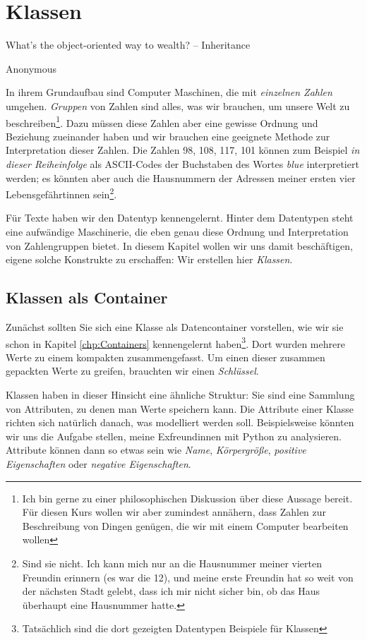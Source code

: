 \chapter{Klassen}
\label{chp:Classes}
\epigraph{
	What's the object-oriented way to wealth? -- Inheritance
}{Anonymous}

In ihrem Grundaufbau sind Computer Maschinen, die mit \emph{einzelnen Zahlen} umgehen. \emph{Gruppen} von Zahlen sind alles, was wir brauchen, um unsere Welt zu beschreiben\footnote{Ich bin gerne zu einer philosophischen Diskussion über diese Aussage bereit. Für diesen Kurs wollen wir aber zumindest annähern, dass Zahlen zur Beschreibung von Dingen genügen, die wir mit einem Computer bearbeiten wollen}. Dazu müssen diese Zahlen aber eine gewisse Ordnung und Beziehung zueinander haben und wir brauchen eine geeignete Methode zur Interpretation dieser Zahlen. Die Zahlen 98, 108, 117, 101 können zum Beispiel \emph{in dieser Reiheinfolge} als ASCII-Codes der Buchstaben des Wortes \emph{blue} interpretiert werden; es könnten aber auch die Hausnummern der Adressen meiner ersten vier Lebensgefährtinnen sein\footnote{Sind sie nicht. Ich kann mich nur an die Hausnummer meiner vierten Freundin erinnern (es war die 12), und meine erste Freundin hat so weit von der nächsten Stadt gelebt, dass ich mir nicht sicher bin, ob das Haus überhaupt eine Hausnummer hatte.}.

Für Texte haben wir den Datentyp  kennengelernt. Hinter dem Datentypen steht eine aufwändige Maschinerie, die eben genau diese Ordnung und Interpretation von Zahlengruppen bietet. In diesem Kapitel wollen wir uns damit beschäftigen, eigene solche Konstrukte zu erschaffen: Wir erstellen hier \emph{Klassen}.

\section{Klassen als Container}
Zunächst sollten Sie sich eine Klasse als Datencontainer vorstellen, wie wir sie schon in Kapitel \ref{chp:Containers} kennengelernt haben\footnote{Tatsächlich sind die dort gezeigten Datentypen Beispiele für Klassen}. Dort wurden mehrere \eg Werte zu einem kompakten  zusammengefasst. Um einen dieser zusammen gepackten Werte zu greifen, brauchten wir einen \emph{Schlüssel}.

Klassen haben in dieser Hinsicht eine ähnliche Struktur: Sie sind eine Sammlung von Attributen, zu denen man Werte speichern kann. Die Attribute einer Klasse richten sich natürlich danach, was modelliert werden soll. Beispielsweise könnten wir uns die Aufgabe stellen, meine Exfreundinnen mit Python zu analysieren. Attribute können dann so etwas sein wie \emph{Name}, \emph{Körpergröße}, \emph{positive Eigenschaften} oder \emph{negative Eigenschaften}.

